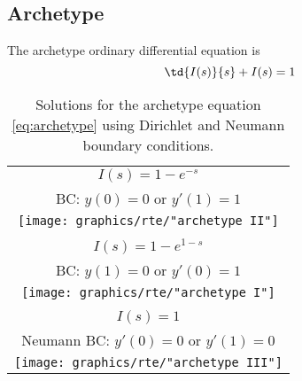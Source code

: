\subsection{\label{subsec:Archetype}Archetype}

The archetype ordinary differential equation is
\begin{equation}
  \td{I(s)}{s} + I(s) = 1
  \label{eq:archetype}
\end{equation}

\begin{table}[htdp]
\caption[Solutions for the archetype equation]{Solutions for the archetype equation \eqref{eq:archetype} using Dirichlet and Neumann boundary conditions.}
\begin{center}
\begin{tabular}{c}
%
 $I(s) = 1 - e^{-s}$ \\
%
 BC: $y(0) = 0$ or $y'(1) = 1$ \\
%
\texttt{[image: graphics/rte/"archetype II"]} \\\hline
%
 \\
%
 $I(s) = 1 - e^{1-s}$ \\
%
 BC: $y(1) = 0$ or $y'(0) = 1$ \\
%
\texttt{[image: graphics/rte/"archetype I"]} \\\hline
%
 \\
%
 $I(s) = 1$ \\
%
 Neumann BC: $y'(0) = 0$ or $y'(1) = 0$ \\
%
\texttt{[image: graphics/rte/"archetype III"]}
%
\end{tabular}
\end{center}
\label{tab:ode:archetype}
\end{table}%

\endinput %